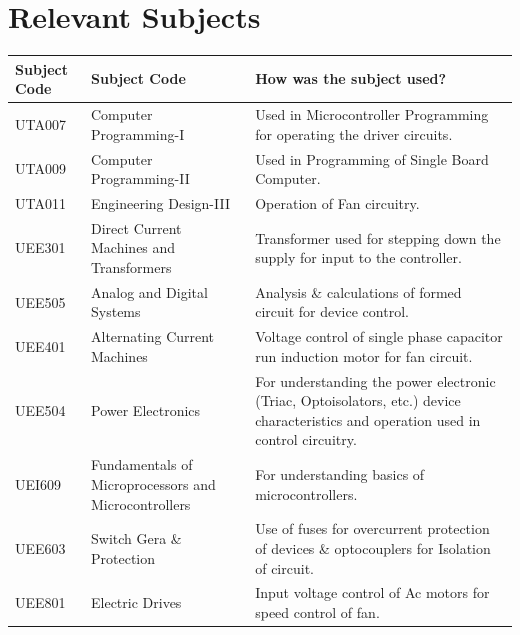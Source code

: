         \section{Relevant Subjects}
                 	\begin{table}[h!]
	        	\begin{tabular}{| l | p{4cm} | p{7.5cm} |}
	        		\hline
	        		\textbf{Subject Code} & \textbf{Subject Code} & \textbf{How was the subject used?}\\
	        		\hline
	        		UTA007 & Computer Programming-I & Used in Microcontroller Programming for operating the driver circuits. \\
	        		\hline
	        		UTA009 & Computer Programming-II & Used in Programming of Single Board Computer.\\
	        		\hline
	        		UTA011 & Engineering Design-III & Operation of Fan circuitry.\\
	        		\hline
	        		UEE301 & Direct Current Machines and Transformers & Transformer used for stepping down the supply for input to the controller. \\
	        		\hline
	        		UEE505  & Analog and Digital Systems & Analysis \& calculations of formed circuit for device control.\\
	        		\hline
	        		UEE401 & Alternating Current Machines & Voltage control of single phase  capacitor run induction motor for fan circuit.\\
	        		\hline
	        		UEE504  & Power Electronics & For understanding the power electronic (Triac, Optoisolators, etc.) device characteristics and operation used in control circuitry.\\
	        		\hline
	        		      		
	        		UEI609 & Fundamentals of Microprocessors and Microcontrollers & For understanding basics of microcontrollers. \\
	        		\hline
	        		UEE603  & Switch Gera \& Protection & Use of fuses for overcurrent protection of devices \&  optocouplers for Isolation of circuit.\\ 
	        		\hline
	        		UEE801  & Electric Drives & Input voltage control of Ac motors for speed control of fan. \\
	        		\hline
	        		
	        		\end{tabular}
	        		\end{table}	
        	
